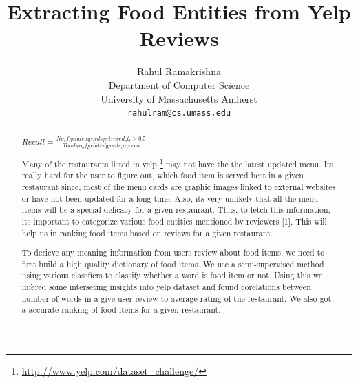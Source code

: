 \documentclass{article} %
\title{Extracting Food Entities from Yelp Reviews}
\author{
Rahul Ramakrishna \\
Department of Computer Science\\
University of Massachusetts Amherst\\
\texttt{rahulram@cs.umass.edu} \\
}
\begin{document}
\maketitle


\begin{abstract}


$Recall = \frac{No_of_Related_Words_Retreved_at_t \geq 0.5}{Total_No_of_Related_Words_in_Vocab}$



Many of the restaurants listed in yelp \footnote{\url{http://www.yelp.com/dataset_challenge/}} may not have the the latest updated menu. Its really hard for the user to figure out, which food item is served best in a given restaurant since, most of the menu cards are graphic images linked to external websites or have not been updated for a long time. Also, its very unlikely that all the menu items will be a special delicacy for a given restaurant. Thus, to fetch this information, its important to categorize various food entities mentioned by reviewers [1]. This will help us in ranking food items based on reviews for a given restaurant. 

To derieve any meaning information from users review about food items, we need to first build a high quality dictionary of food items. We use a semi-supervised method using various classfiers to classify whether a word is food item or not. Using this we infered some interseting insights into yelp dataset and found corelations between number of words in a give user review to average rating of the restaurant. We also got a accurate ranking of food items for a given restaurant.




\end{abstract}
\end{document}
